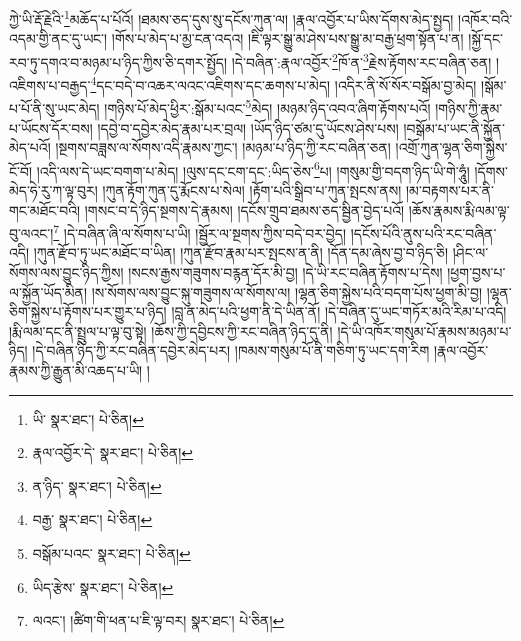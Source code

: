 ཀྱེ་ཡི་རྡོ་རྗེའི་\footnote{ཡི་  སྣར་ཐང་།  པེ་ཅིན། }མཆོད་པ་པོའོ། །ཐམས་ཅད་དུས་སུ་དངོས་ཀུན་ལ། །རྣལ་འབྱོར་པ་ཡིས་དོགས་མེད་སྤྱད། །འཁོར་བའི་འདམ་གྱི་ནང་དུ་ཡང་། །གོས་པ་མེད་པ་མྱ་ངན་འདའ། །ཇི་ལྟར་སྒྱུ་མ་ཤེས་པས་སྒྱུ་མ་བརྒྱ་ཕྲག་སྟོན་པ་ན། །སྐྱོ་དང་རབ་ཏུ་དགའ་བ་མཉམ་པ་ཉིད་ཀྱིས་ཅི་དགར་སྤྱོད། །དེ་བཞིན་:རྣལ་འབྱོར་\footnote{རྣལ་འབྱོར་དེ་  སྣར་ཐང་།  པེ་ཅིན། }ཁོ་ན་\footnote{ན་ཉིད་  སྣར་ཐང་།  པེ་ཅིན། }རྗེས་རྟོགས་རང་བཞིན་ཅན། །འཇིགས་པ་བརྒྱད་\footnote{བརྒྱ་  སྣར་ཐང་།  པེ་ཅིན། }དང་བདེ་བ་འཆར་ལའང་འཇིགས་དང་ཆགས་པ་མེད། །འདིར་ནི་སོ་སོར་བསྒོམ་བྱ་མེད། །སྒོམ་པ་པོ་ནི་སུ་ཡང་མེད། །གཉིས་པོ་མེད་ཕྱིར་:སྒོམ་པའང་\footnote{བསྒོམ་པའང་  སྣར་ཐང་།  པེ་ཅིན། }མེད། །མཉམ་ཉིད་འབའ་ཞིག་རྟོགས་པའོ། །གཉིས་ཀྱི་རྣམ་པ་ཡོངས་དོར་བས། །དབྱེ་བ་དབྱེར་མེད་རྣམ་པར་བྲལ། །ཡོད་ཉིད་ཙམ་དུ་ཡོངས་ཤེས་པས། །བསྒོམ་པ་ཡང་ནི་སྐྱོན་མེད་པའོ། །སྔགས་བཟླས་ལ་སོགས་འདི་རྣམས་ཀྱང་། །མཉམ་པ་ཉིད་ཀྱི་རང་བཞིན་ཅན། །འགྲོ་ཀུན་ལྷན་ཅིག་སྐྱེས་ངོ་བོ། །འདི་ལས་དེ་ཡང་བགག་པ་མེད། །ལུས་དང་ངག་དང་:ཡིད་ཅེས་\footnote{ཡིད་རྩེས་  སྣར་ཐང་།  པེ་ཅིན། }པ། །གསུམ་གྱི་བདག་ཉིད་ཡི་གེ་ཧཱུཾ། །དོགས་མེད་ཧེ་རུ་ཀ་ལྟ་བུར། །ཀུན་རྟོག་ཀུན་དུ་རྨོངས་པ་སེལ། །རྟོག་པའི་སྒྲིབ་པ་ཀུན་སྤངས་ནས། །མ་བརྟགས་པར་ནི་གང་མཐོང་བའི། །གསང་བ་དེ་ཉིད་སྔགས་དེ་རྣམས། །དངོས་གྲུབ་ཐམས་ཅད་སྦྱིན་བྱེད་པའོ། །ཆོས་རྣམས་རྨི་ལམ་ལྟ་བུ་ལའང་།\footnote{ལའང་། །ཚིག་གི་ཕན་པ་ཇི་ལྟ་བར།  སྣར་ཐང་།  པེ་ཅིན། } །དེ་བཞིན་ཞི་ལ་སོགས་པ་ཡི། །སྦྱོར་ལ་སྔགས་ཀྱིས་བདེ་བར་བྱེད། །དངོས་པོའི་ནུས་པའི་རང་བཞིན་འདི། །ཀུན་རྫོབ་ཏུ་ཡང་མཐོང་བ་ཡིན། །ཀུན་རྫོབ་རྣམ་པར་སྤངས་ན་ནི། །དོན་དམ་ཞེས་བྱ་བ་ཉིད་ཅི། །ཤིང་ལ་སོགས་ལས་བྱུང་ཉིད་ཀྱིས། །སངས་རྒྱས་གཟུགས་བརྙན་དོར་མི་བྱ། །དེ་ཡི་རང་བཞིན་རྟོགས་པ་དེས། །ཕྱག་བྱས་པ་ལ་སྐྱོན་ཡོད་མིན། །ས་སོགས་ལས་བྱུང་སྐུ་གཟུགས་ལ་སོགས་ལ། །ལྷན་ཅིག་སྐྱེས་པའི་བདག་པོས་ཕྱག་མི་བྱ། །ལྷན་ཅིག་སྐྱེས་པ་རྟོགས་པར་གྱུར་པ་ཉིད། །བླ་ན་མེད་པའི་ཕྱག་ནི་དེ་ཡིན་ནོ། །དེ་བཞིན་དུ་ཡང་གཏོར་མའི་རིམ་པ་འདི། །རྨི་ལམ་དང་ནི་སྤྲུལ་པ་ལྟ་བུ་སྟེ། །ཆོས་ཀྱི་དབྱིངས་ཀྱི་རང་བཞིན་ཉིད་དུ་ནི། །དེ་ཡི་འཁོར་གསུམ་པོ་རྣམས་མཉམ་པ་ཉིད། །དེ་བཞིན་ཉིད་ཀྱི་རང་བཞིན་དབྱེར་མེད་པར། །ཁམས་གསུམ་པོ་ནི་གཅིག་ཏུ་ཡང་དག་རིག །རྣལ་འབྱོར་རྣམས་ཀྱི་རྒྱུན་མི་འཆད་པ་ཡི། །
